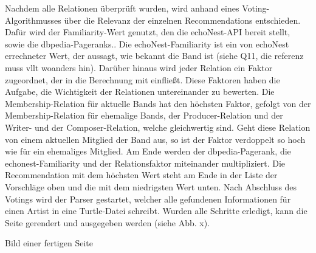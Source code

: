 Nachdem alle Relationen überprüft wurden, wird anhand eines Voting-Algorithmusses über die Relevanz der einzelnen Recommendations entschieden. Dafür wird der Familiarity-Wert genutzt, den die echoNest-API bereit stellt, sowie die dbpedia-Pageranks.. Die echoNest-Familiarity ist ein von echoNest errechneter Wert, der aussagt, wie bekannt die Band ist (siehe Q11, die referenz muss vllt woanders hin).
Darüber hinaus wird jeder Relation ein Faktor zugeordnet, der in die Berechnung mit einfließt. Diese Faktoren haben die Aufgabe, die Wichtigkeit der Relationen untereinander zu bewerten. Die Membership-Relation für aktuelle Bands hat den höchsten Faktor, gefolgt von der Membership-Relation für ehemalige Bands, der Producer-Relation und der Writer- und der Composer-Relation, welche gleichwertig sind. Geht diese Relation von einem aktuellen Mitglied der Band aus, so ist der Faktor verdoppelt so hoch wie für ein ehemaliges Mitglied. Am Ende werden der dbpedia-Pagerank, die echonest-Familiarity und der Relationsfaktor miteinander multipliziert. Die Recommendation mit dem höchsten Wert steht am Ende in der Liste der Vorschläge oben und die mit dem niedrigsten Wert unten.
Nach Abschluss des Votings wird der Parser gestartet, welcher alle gefundenen Informationen für einen Artist in eine Turtle-Datei schreibt.
Wurden alle Schritte erledigt, kann die Seite gerendert und ausgegeben werden (siehe Abb. x).


Bild einer fertigen Seite